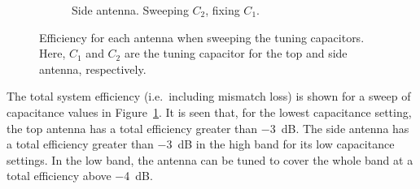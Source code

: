 \begin{figure}[htbp]
\begin{subfigure}{0.49\linewidth}
        \caption{Side antenna. Sweeping $C_2$, fixing $C_1$.}
    \end{subfigure}
    \caption{Efficiency for each antenna when sweeping the tuning capacitors. Here, $C_1$ and $C_2$ are the tuning capacitor for the top and side antenna, respectively.}
    \label{fig:eff_sol2}
\end{figure}

The total system efficiency (i.e.\ including mismatch loss) is shown for a sweep of capacitance values in Figure~\ref{fig:eff_sol2}. It is seen that, for the lowest capacitance setting, the top antenna has a total efficiency greater than \SI{-3}{dB}. The side antenna has a total efficiency greater than \SI{-3}{dB} in the high band for its low capacitance settings. In the low band, the antenna can be tuned to cover the whole band at a total efficiency above \SI{-4}{dB}.
